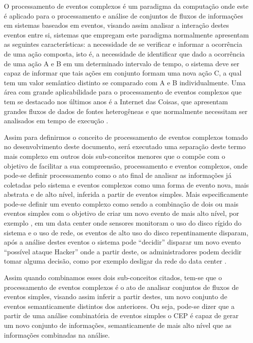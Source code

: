 \documentclass[ti,table]{texufpel} %
\begin{document}
O processamento de eventos complexos é um paradigma da computação onde este é aplicado para o processamento e análise de conjuntos de fluxos de informações em sistemas baseados em eventos, visando assim analisar a interação destes eventos entre si, sistemas que empregam este paradigma normalmente apresentam as seguintes características: a necessidade de se verificar e informar a ocorrência de uma ação composta, isto é, a necessidade de identificar que dado a ocorrência de uma ação A e B em um determinado intervalo de tempo, o sistema deve ser capaz de informar que tais ações em conjunto formam uma nova ação C, a qual tem um valor semântico distinto se comparado com A e B individualmente. Uma área com grande aplicabilidade para o processamento de eventos complexos que tem se destacado nos últimos anos é a Internet das Coisas, que apresentam grandes fluxos de dados de fontes heterogêneas e que normalmente necessitam ser analisados em tempo de execução \cite{jun2014design}.  

  

Assim para definirmos o conceito de processamento de eventos complexos tomado no desenvolvimento deste documento, será executado uma separação deste termo mais complexo em outros dois sub-conceitos menores que o compõe com o objetivo de facilitar a sua compreensão, processamento e eventos complexos, onde pode-se definir processamento como o ato final de analisar as informações já coletadas pelo sistema e eventos complexos como uma forma de evento nova, mais abstrata e de alto nível, inferida a partir de eventos simples. Mais especificamente pode-se definir um evento complexo como sendo a combinação de dois ou mais eventos simples com o objetivo de criar um novo evento de mais alto nível, por exemplo \cite{dayarathna2018recent}, em um data center onde sensores monitoram o uso do disco rígido do sistema e o uso de rede, os eventos de alto uso do disco repentinamente disparam, após a análise destes eventos o sistema pode ``decidir'' disparar um novo evento  ``possível ataque Hacker'' onde a partir deste, os administradores podem decidir tomar alguma decisão, como por exemplo desligar da rede do data center \cite{wu2006high}.  

  

Assim quando combinamos esses dois sub-conceitos citados, tem-se que o processamento de eventos complexos é o ato de analisar conjuntos de fluxos de eventos simples, visando assim inferir a partir destes, um novo conjunto de eventos semanticamente distintos dos anteriores. Ou seja, pode-se dizer que a partir de uma análise combinatória de eventos simples o CEP é capaz de gerar um novo conjunto de informações, semanticamente de mais alto nível que as informações combinadas na análise. 
\end{document}
